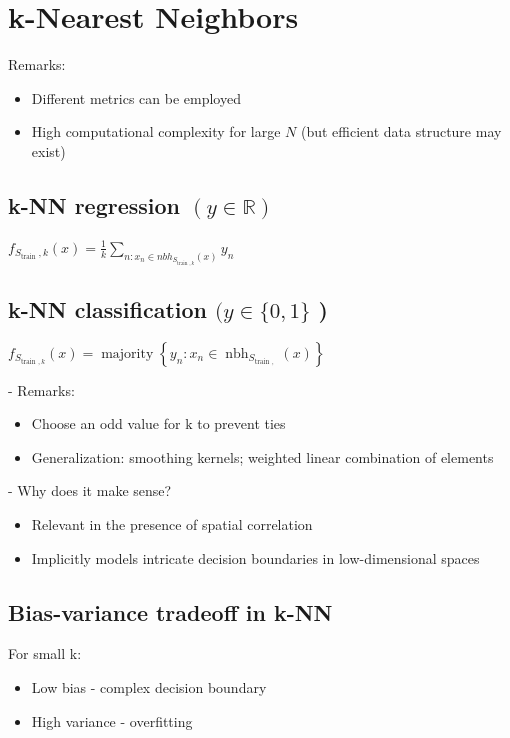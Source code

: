 \section*{k-Nearest Neighbors}

Remarks:

\begin{itemize}
  \item Different metrics can be employed
  \item High computational complexity for large $N$ (but efficient data structure may exist)
\end{itemize}

\subsection*{k-NN regression $(y \in \mathbb{R})$}
$
f_{S_{\text {train }}, k}(x)=\frac{1}{k} \sum_{n: x_{n} \in n b h_{S_{\text {train }, k}}(x)} y_{n}
$




\subsection*{k-NN classification $(y \in\{0,1\}$ )}
$
f_{S_{\text {train }, k}}(x)=\operatorname{majority}\left\{y_{n}: x_{n} \in \operatorname{nbh}_{S_{\text {train }, ~}}(x)\right\}
$


- Remarks:

\begin{itemize}
  \item Choose an odd value for $\mathrm{k}$ to prevent ties
  \item Generalization: smoothing kernels; weighted linear combination of elements
\end{itemize}

- Why does it make sense?
\begin{itemize}
  \item Relevant in the presence of spatial correlation

  \item Implicitly models intricate decision boundaries in low-dimensional spaces

\end{itemize}


\subsection*{Bias-variance tradeoff in k-NN}
For small k:

\begin{itemize}
  \item Low bias - complex decision boundary
  \item High variance - overfitting
\end{itemize}


